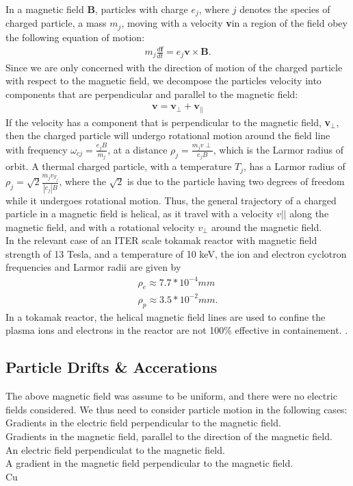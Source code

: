 \documentclass{article}
\begin{document}
In a magnetic field \textbf{B}, particles  with charge $e_j$, where $j$ denotes the species of charged particle, a mass $m_j$, moving with a velocity \textbf{v}in a region of the field obey the following equation of motion:
\begin{align*}
m_j\frac{d \textbf{f}}{dt} = e_j \textbf{v}\times \textbf{B}.
\end{align*}
Since we are only concerned with the direction of motion of the charged particle with respect to the magnetic field, we decompose the particles velocity into components that are perpendicular and parallel to the magnetic field:
\begin{align*}
\textbf{v} = \textbf{v}_{\perp} + \textbf{v}_{||}
\end{align*}  
If the velocity has a component that is perpendicular to the magnetic field, \textbf{v}$_{\perp}$, then the charged particle will undergo rotational motion around the field line with frequency $\omega_{cj} = \frac{e_jB}{m_j}$, at a distance $\rho_j = \frac{m_j v\perp}{e_j B}$, which is the Larmor radius of orbit. A thermal charged particle, with a temperature $T_j$, has a Larmor radius of $\rho_{j} = \sqrt{2}\frac{m_j v_{T_j}}{|e_j| B}$, where the $\sqrt{2}$ is due to the particle having two degrees of freedom while it undergoes rotational motion. Thus, the general trajectory of a charged particle in a magnetic field is helical, as it travel with a velocity $v||$ along the magnetic field, and with  a rotational velocity $v_{\perp}$ around the magnetic field.\\
In the relevant case of an ITER scale tokamak reactor with magnetic field strength of 13 Tesla, and a temperature of 10 keV, the ion and electron cyclotron frequencies and Larmor radii are given by
\begin{align*}
\rho_e \approx 7.7*10^{-4}mm\\
\rho_p \approx  3.5*10^{-2}mm. 
\end{align*}
In a tokamak reactor, the helical magnetic field lines are used to confine the plasma ions and electrons in the reactor are not 100\% effective in containement. .\\
\subsection{Particle Drifts \& Accerations }
The above magnetic field was assume to be uniform, and there were no electric fields considered. We thus need to consider particle motion in the following cases:\\
Gradients in the electric field perpendicular to the magnetic field.\\
Gradients in the magnetic field, parallel to the direction of the magnetic field.\\
An electric field perpendiculat to the magnetic field.\\
A gradient in the magnetic field perpendicular to the magnetic field.\\
Cu
\end{document}
